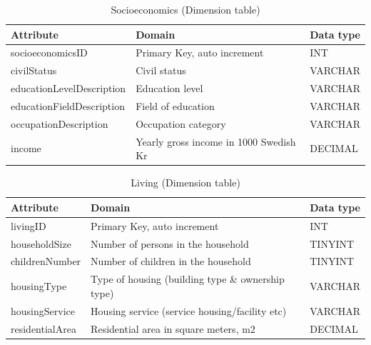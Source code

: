 \begin{table}[htbp]
  \centering
  \caption{Socioeconomics (Dimension table)}
  \begin{tabular}{|l|l|l|}
    \hline
    \textbf{Attribute} & \textbf{Domain} & \textbf{Data type} \\
    \hline
    socioeconomicsID & Primary Key, auto increment & INT \\
    \hline
    civilStatus & Civil status & VARCHAR \\
    \hline
    educationLevelDescription & Education level & VARCHAR \\
    \hline
    educationFieldDescription & Field of education & VARCHAR \\
    \hline
    occupationDescription & Occupation category & VARCHAR \\
    \hline
    income & Yearly gross income in 1000 Swedish Kr & DECIMAL \\
    \hline
  \end{tabular}
\end{table}

\begin{table}[htbp]
  \centering
  \caption{Living (Dimension table)}
  \begin{tabular}{|l|l|l|}
    \hline
    \textbf{Attribute} & \textbf{Domain} & \textbf{Data type} \\
    \hline
    livingID & Primary Key, auto increment & INT \\
    \hline
    householdSize & Number of persons in the household & TINYINT \\
    \hline
    childrenNumber & Number of children in the household & TINYINT \\
    \hline
    housingType & Type of housing (building type \& ownership type) & VARCHAR \\
    \hline
    housingService & Housing service (service housing/facility etc) & VARCHAR \\
    \hline
    residentialArea & Residential area in square meters, m2 & DECIMAL \\
    \hline
  \end{tabular}
\end{table}